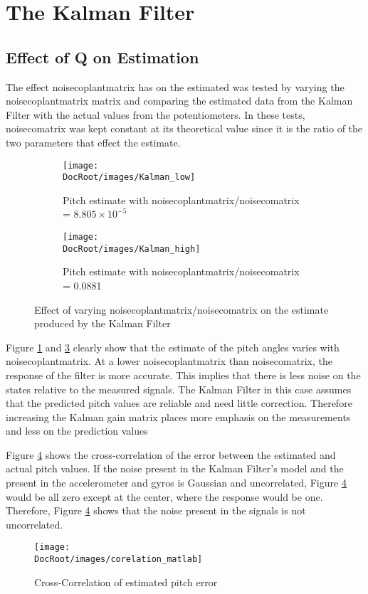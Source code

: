 \section{The Kalman Filter}
\subsection{Effect of Q on Estimation} 
The effect \gls{noisecoplantmatrix} has on the estimated was tested by varying the \gls{noisecoplantmatrix} matrix and comparing the estimated data from the Kalman Filter with the actual values from the potentiometers. In these tests, \gls{noisecomatrix} was kept constant at its theoretical value since it is the ratio of the two parameters that effect the estimate.


\begin{figure}[h]
	\centering
	\begin{subfigure}{0.32\textwidth}
		\texttt{[image: \\DocRoot/images/Kalman\_low]}
	\caption{Pitch estimate with \gls{noisecoplantmatrix}/\gls{noisecomatrix} = $8.805\times10^{-5}$}
	\label{Fig:q/r ratio low}
	\end{subfigure}%
	\hspace{3cm}
	\begin{subfigure}{0.32\textwidth}
		\texttt{[image: \\DocRoot/images/Kalman\_high]}
	\caption{Pitch estimate with \gls{noisecoplantmatrix}/\gls{noisecomatrix} = 0.0881}
	\label{Fig:q/r ratio high}
	\end{subfigure}
	
	\caption{Effect of varying \gls{noisecoplantmatrix}/\gls{noisecomatrix} on the estimate produced by the Kalman Filter }	
\end{figure}
Figure \ref{Fig:q/r ratio low} and \ref{Fig:q/r ratio high} clearly show that the estimate of the pitch angles varies with \gls{noisecoplantmatrix}. At a lower \gls{noisecoplantmatrix} than \gls{noisecomatrix}, the response of the filter is more accurate. This implies that there is less noise on the states relative to the  measured signals. The Kalman Filter in this case assumes that the predicted pitch values are reliable and need little correction. Therefore increasing the Kalman gain matrix places more emphasis on the measurements and less on the prediction values \cite{gordon_paper}

Figure \ref{Fig:Cross-Correlation of estimated pitch error} shows the cross-correlation of the error between the estimated and actual pitch values. If the noise present in the Kalman Filter's model and the present in the accelerometer and gyros is Gaussian and uncorrelated, Figure \ref{Fig:Cross-Correlation of estimated pitch error} would be all zero except at the center, where the response would be one. Therefore, Figure \ref{Fig:Cross-Correlation of estimated pitch error} shows that the noise present in the signals is not uncorrelated.

\begin{figure}[h]
	\centering
	\texttt{[image: \\DocRoot/images/corelation\_matlab]}
	\caption{Cross-Correlation of estimated pitch error}
	\label{Fig:Cross-Correlation of estimated pitch error}
\end{figure}